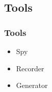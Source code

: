 \documentclass{beamer}
\begin{document}
\subsection{Tools}
\begin{frame}[fragile]
\frametitle{Tools}
\begin{itemize}
\item Spy
\item Recorder
\item Generator
\end{itemize}
\end{frame}
\end{document}

